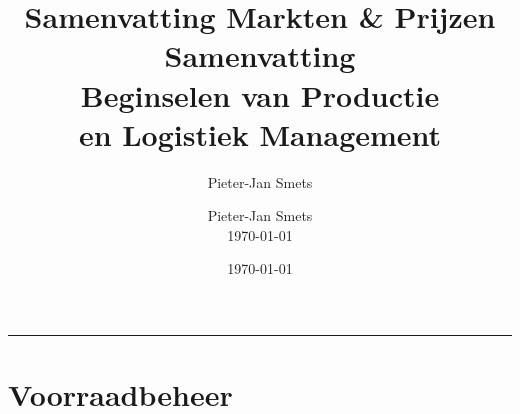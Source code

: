 \documentclass[10pt,a4paper]{article}
\author{Pieter-Jan Smets}
\title{Samenvatting Markten & Prijzen}
\date{\today}
\title{	\fontsize{40}{60}\selectfont
			\vspace*{0.7cm}
			\hfill Samenvatting 		\\[0.8cm]
			\hfill Beginselen van Productie\\[0.8cm]%
            \hfill en Logistiek Management\\[0.8cm]
		}
\author{
		\hfill Pieter-Jan Smets\\
		\hfill \today \\
}
\makeatletter
\newcommand{\HRule}[1]{\hfill \rule{0.2\linewidth}{#1}} 	%
\def\printtitle{%
    {\centering \@title\par}}
\def\printauthor{%
    {\centering \large \@author}}
\makeatother
\begin{document}
\thispagestyle{empty}				%

\colorbox{grey}{
	\parbox[t]{1.0\linewidth}{
		\printtitle
		\vspace*{0.7cm}
	}
}

  	\vfill
\printauthor								%
\HRule{1pt}
\clearpage


\tableofcontents
\newpage

\listoffigures
\newpage


%
\part{Voorraadbeheer}


\end{document}
